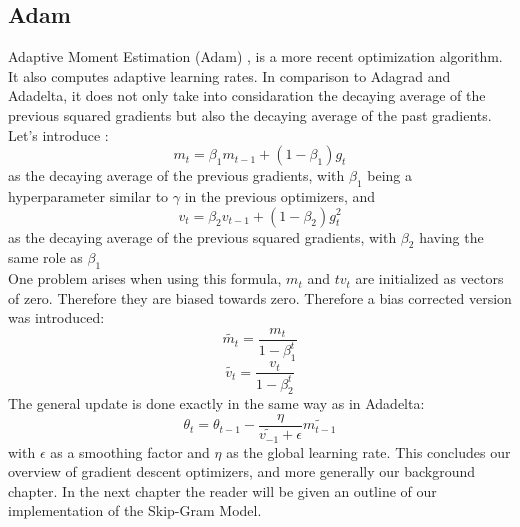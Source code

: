 \subsection{Adam}
Adaptive Moment Estimation (Adam) \cite{adam}, is a more recent optimization algorithm. It also computes adaptive learning rates. In comparison to Adagrad and Adadelta, it does not only take into considaration the decaying average of the previous squared gradients but also the decaying average of the past gradients. 
Let's introduce : 
\begin{equation}
m_t = \beta_1 m_{t-1} + (1- \beta_1) g_t 
\end{equation}
as the decaying average of the previous gradients, with $\beta_1$ being a hyperparameter similar to $\gamma$ in the previous optimizers,  and 
\begin{equation}
v_t = \beta_2 v_{t-1} + (1- \beta_2) g^2_t 
\end{equation}
 as the decaying average of the previous squared gradients, with $\beta_2$ having the same role as $\beta_1$ \\
One problem arises when using this formula, $m_t$  and $tv_t$ are initialized as vectors of zero. Therefore they are biased towards zero. Therefore a bias corrected version was introduced:\\
\begin{equation}
\tilde{m_t} = \frac{m_t}{1-\beta^t_1}
\end{equation}
\begin{equation}
\tilde{v_t} = \frac{v_t}{1-\beta^t_2}
\end{equation}
The general update is done exactly in the same way as in Adadelta:
\begin{equation}
\theta_{t} = \theta_{t-1} - \frac{\eta}{\tilde{v_{-1}}+ \epsilon} \tilde{m_{t-1}}
\end{equation}
with $\epsilon$ as a smoothing factor and $\eta$ as the global learning rate.  This concludes our overview of gradient descent optimizers, and more generally our background chapter. In the next chapter the reader will be given an outline of our implementation of the Skip-Gram Model.